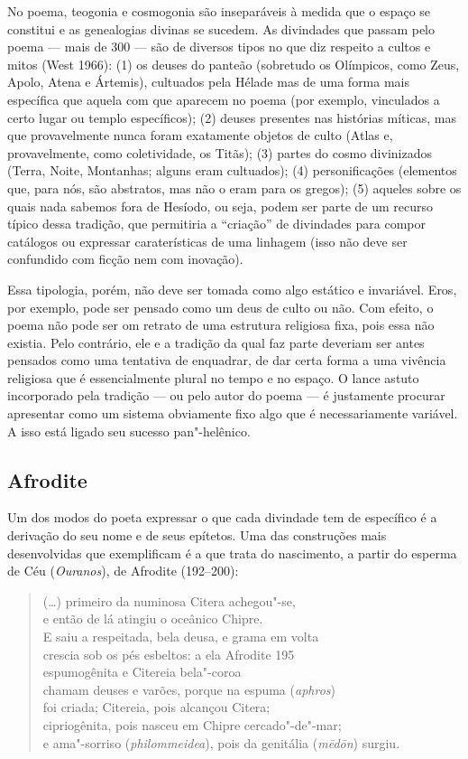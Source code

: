 No poema, teogonia e cosmogonia são inseparáveis à medida que o espaço
se constitui e as genealogias divinas se sucedem. As divindades que
passam pelo poema --- mais de 300 --- são de diversos tipos no que diz
respeito a cultos e mitos (West 1966): (1) os deuses do panteão
(sobretudo os Olímpicos, como Zeus, Apolo, Atena e Ártemis), cultuados
pela Hélade mas de uma forma mais específica que aquela com que aparecem
no poema (por exemplo, vinculados a certo lugar ou templo específicos);
(2) deuses presentes nas histórias míticas, mas que provavelmente nunca
foram exatamente objetos de culto (Atlas e, provavelmente, como
coletividade, os Titãs); (3) partes do cosmo divinizados (Terra, Noite,
Montanhas; alguns eram cultuados); (4) personificações (elementos que,
para nós, são abstratos, mas não o eram para os gregos); (5) aqueles
sobre os quais nada sabemos fora de Hesíodo, ou seja, podem ser parte de
um recurso típico dessa tradição, que permitiria a ``criação'' de
divindades para compor catálogos ou expressar caraterísticas de uma
linhagem (isso não deve ser confundido com ficção nem com inovação).

Essa tipologia, porém, não deve ser tomada como algo estático e
invariável. Eros, por exemplo, pode ser pensado como um deus de culto ou
não. Com efeito, o poema não pode ser om retrato de uma estrutura
religiosa fixa, pois essa não existia. Pelo contrário, ele e a tradição
da qual faz parte deveriam ser antes pensados como uma tentativa de
enquadrar, de dar certa forma a uma vivência religiosa que é
essencialmente plural no tempo e no espaço. O lance astuto incorporado
pela tradição --- ou pelo autor do poema --- é justamente procurar
apresentar como um sistema obviamente fixo algo que é necessariamente
variável. A isso está ligado seu sucesso pan"-helênico.

\subsection{Afrodite}

Um dos modos do poeta expressar o que cada divindade tem de específico é
a derivação do seu nome e de seus epítetos. Uma das construções mais
desenvolvidas que exemplificam é a que trata do nascimento, a partir do
esperma de Céu (\emph{Ouranos}), de Afrodite (192--200):

\begin{verse}
(\ldots{}) primeiro da numinosa Citera achegou"-se,\\
e então de lá atingiu o oceânico Chipre.\\
E saiu a respeitada, bela deusa, e grama em volta\\
crescia sob os pés esbeltos: a ela Afrodite \num{195}\\
espumogênita e Citereia bela"-coroa\\
chamam deuses e varões, porque na espuma (\emph{aphros})\\
foi criada; Citereia, pois alcançou Citera;\\
cipriogênita, pois nasceu em Chipre cercado"-de"-mar;\\
e ama"-sorriso (\emph{philommeidea}), pois da genitália (\emph{mēdōn}) surgiu.
\end{verse}

